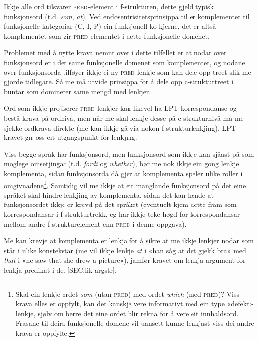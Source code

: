 \documentclass[11pt,a4paper,oneside,draft]{report}
\newcommand{\F}[2]{\textsc{#1}\ensuremath{_{#2}}}
\newcommand{\PRED}{\F{pred}{}}
\begin{document}
\label{SEC:fnord}

Ikkje alle ord tilsvarer \PRED{}-element i f-strukturen, dette gjeld
typisk funksjonsord (t.d. \emph{som}, \emph{at}). 
Ved endosentrisitetsprinsippa
til \citet{bresnan2001lfs} er komplementet til funksjonelle kategoriar
(C, I, P) ein funksjonell ko-kjerne, det er altså komplementet som gir
\PRED{}-elementet i dette funksjonelle domenet.

Problemet med å nytte krava nemnt over i dette tilfellet er at nodar
over funksjonsord er i det same funksjonelle domenet som komplementet,
og nodane over funksjonsorda tilføyer ikkje ei ny \PRED{}-lenkje som kan
dele opp treet slik me gjorde tidlegare. Så me må utvide prinsippa for
å dele opp c-strukturtreet i buntar som dominerer same mengd med
lenkjer.

Ord som ikkje projiserer \PRED{}-lenkjer kan likevel ha
LPT-korrespondanse og bestå krava på ordnivå, men når me skal lenkje
desse på c-strukturnivå må me sjekke ordkrava direkte (me kan ikkje gå
via nokon f-strukturlenkjing). LPT-kravet gir oss eit utgangspunkt for
lenkjing.

Viss begge språk har funksjonsord, men funksjonsord som ikkje kan
sjåast på som moglege omsetjingar (t.d. \emph{fordi} og \emph{whether}), bør me
nok ikkje ein gong lenkje komplementa, sidan funksjonsorda då gjer at
komplementa speler ulike roller i omgivnadene\footnote{Skal ein lenkje ordet \emph{som} (utan \PRED{}) med ordet \emph{which} (med
        \PRED{})? Viss krava elles er oppfylt, kan det kanskje vere
        informativt med ein type «defekt» lenkje, sjølv om berre det
        eine ordet blir rekna for å vere eit innhaldsord. Frasane til
        deira funksjonelle domene vil uansett kunne lenkjast viss dei andre
        krava er oppfylte. }. Samtidig vil me
ikkje at eit manglande funksjonsord på det eine språket skal hindre
lenkjing av komplementa, sidan det kan hende at funksjonsordet ikkje
er krevd på det språket (eventuelt kjem dette fram som korrespondansar
i f-strukturtrekk, eg har ikkje teke høgd for korrespondansar mellom
andre f-strukturelement enn \PRED{} i denne oppgåva).

Me kan krevje at komplementa er lenkja for å sikre at me ikkje lenkjer
nodar som står i ulike konstekstar (me vil ikkje lenkje \emph{at} i «han
såg at det gjekk bra» med \emph{that} i «he saw that she drew a picture»),
jamfør kravet om lenkja argument for lenkja predikat i del
\ref{SEC:lik-argstr}.
\end{document}
